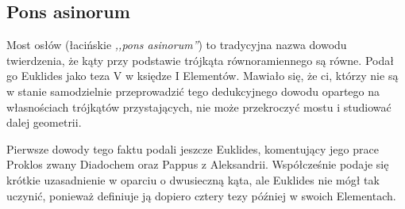 %


\subsection{Pons asinorum}
Most osłów (łacińskie \emph{,,pons asinorum''}) to tradycyjna nazwa dowodu twierdzenia, że kąty przy podstawie trójkąta równoramiennego są równe.
Podał go Euklides jako teza V w księdze I Elementów.
Mawiało się, że ci, którzy nie są w stanie samodzielnie przeprowadzić tego dedukcyjnego dowodu opartego na własnościach trójkątów przystających, nie może przekroczyć mostu i studiować dalej geometrii.

Pierwsze dowody tego faktu podali jeszcze Euklides, komentujący jego prace Proklos zwany Diadochem oraz Pappus z Aleksandrii.
Współcześnie podaje się krótkie uzasadnienie w oparciu o dwusieczną kąta, ale Euklides nie mógł tak uczynić, ponieważ definiuje ją dopiero cztery tezy później w swoich Elementach.


%